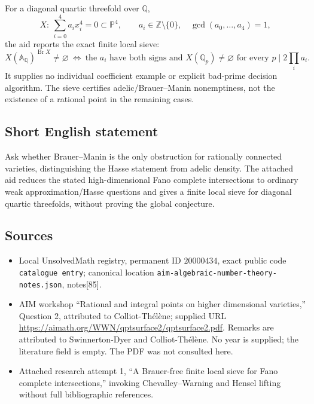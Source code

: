 \documentclass[11pt]{article}
\newcommand{\Z}{\mathbb{Z}}
\newcommand{\Q}{\mathbb{Q}}
\newcommand{\A}{\mathbb{A}}
\newcommand{\PP}{\mathbb{P}}
\begin{document}
For a diagonal quartic threefold over \(\Q\),
\[
X:\ \sum_{i=0}^4a_ix_i^4=0\subset\PP^4,
\qquad a_i\in\Z\setminus\{0\},\quad\gcd(a_0,\ldots,a_4)=1,
\]
the aid reports the exact finite local sieve:
\[
X(\A_{\Q})^{\operatorname{Br}X}\ne\varnothing
\ \Longleftrightarrow\ 
\text{the }a_i\text{ have both signs and }X(\Q_p)\ne\varnothing
\text{ for every }p\mid2\prod_i a_i.
\]
It supplies no individual coefficient example or explicit bad-prime decision algorithm. The sieve certifies adelic/Brauer--Manin nonemptiness, not the existence of a rational point in the remaining cases.
\subsection{Short English statement}
Ask whether Brauer--Manin is the only obstruction for rationally connected varieties, distinguishing the Hasse statement from adelic density. The attached aid reduces the stated high-dimensional Fano complete intersections to ordinary weak approximation/Hasse questions and gives a finite local sieve for diagonal quartic threefolds, without proving the global conjecture.
\subsection{Sources}
\begin{itemize}
\item Local UnsolvedMath registry, permanent ID \(20000434\), exact public code \texttt{catalogue entry}; canonical location \texttt{aim-algebraic-number-theory-notes.json}, notes[85].
\item AIM workshop ``Rational and integral points on higher dimensional varieties,'' Question 2, attributed to Colliot-Th\'el\`ene; supplied URL \url{https://aimath.org/WWN/qptsurface2/qptsurface2.pdf}. Remarks are attributed to Swinnerton-Dyer and Colliot-Th\'el\`ene. No year is supplied; the literature field is empty. The PDF was not consulted here.
\item Attached research attempt 1, ``A Brauer-free finite local sieve for Fano complete intersections,'' invoking Chevalley--Warning and Hensel lifting without full bibliographic references.
\end{itemize}
\end{document}
